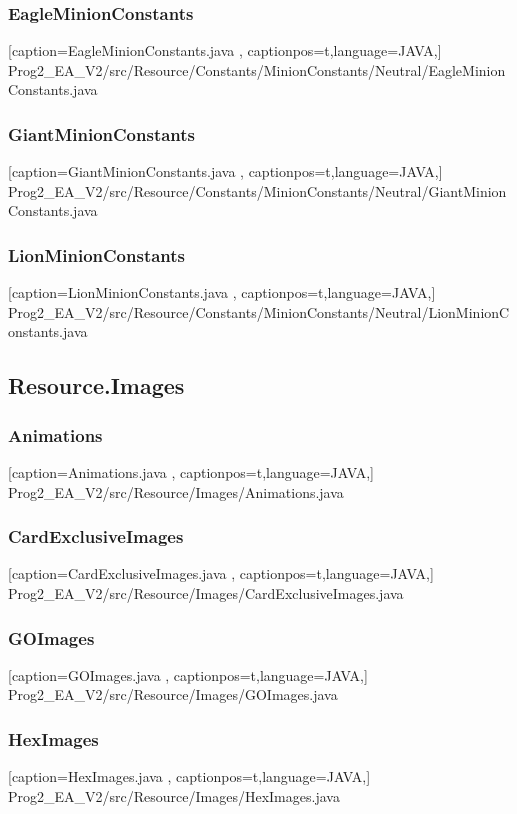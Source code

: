 \documentclass[a4paper,12pt]{scrartcl}
\begin{document}
	\subsubsection{EagleMinionConstants}
	
	[caption={EagleMinionConstants.java}
	\label{lst:javaclass},
	captionpos=t,language=JAVA,]
	{Prog2_EA_V2/src/Resource/Constants/MinionConstants/Neutral/EagleMinionConstants.java}
	\subsubsection{GiantMinionConstants}
	
	[caption={GiantMinionConstants.java}
	\label{lst:javaclass},
	captionpos=t,language=JAVA,]
	{Prog2_EA_V2/src/Resource/Constants/MinionConstants/Neutral/GiantMinionConstants.java}
	\subsubsection{LionMinionConstants}
	
	[caption={LionMinionConstants.java}
	\label{lst:javaclass},
	captionpos=t,language=JAVA,]
	{Prog2_EA_V2/src/Resource/Constants/MinionConstants/Neutral/LionMinionConstants.java}
	\subsection{Resource.Images}
	\subsubsection{Animations}
	
	[caption={Animations.java}
	\label{lst:javaclass},
	captionpos=t,language=JAVA,]
	{Prog2_EA_V2/src/Resource/Images/Animations.java}
	\subsubsection{CardExclusiveImages}
	
	[caption={CardExclusiveImages.java}
	\label{lst:javaclass},
	captionpos=t,language=JAVA,]
	{Prog2_EA_V2/src/Resource/Images/CardExclusiveImages.java}
	\subsubsection{GOImages}
	
	[caption={GOImages.java}
	\label{lst:javaclass},
	captionpos=t,language=JAVA,]
	{Prog2_EA_V2/src/Resource/Images/GOImages.java}
	\subsubsection{HexImages}
	
	[caption={HexImages.java}
	\label{lst:javaclass},
	captionpos=t,language=JAVA,]
	{Prog2_EA_V2/src/Resource/Images/HexImages.java}
\end{document}
